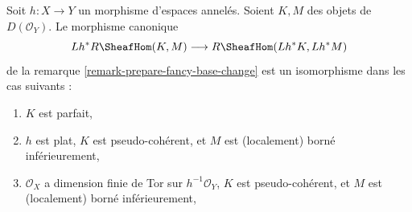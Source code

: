 \begin{lemma}

\label{lemma-pullback-internal-hom}

Soit $h : X \to Y$ un morphisme d'espaces annelés. Soient $K, M$ des objets de $D(\mathcal{O}_Y)$. Le morphisme canonique
$$
Lh^*R\SheafHom(K, M) \longrightarrow R\SheafHom(Lh^*K, Lh^*M)
$$
de la remarque \ref{remark-prepare-fancy-base-change}
est un isomorphisme dans les cas suivants :

\begin{enumerate}

\item  $K$ est parfait,
\item  $h$ est plat, $K$ est pseudo-cohérent, et $M$ est (localement) borné inférieurement,
\item  $\mathcal{O}_X$ a dimension finie de Tor sur $h^{-1}\mathcal{O}_Y$,
$K$ est pseudo-cohérent, et $M$ est (localement) borné inférieurement,

\end{enumerate}

\end{lemma}

